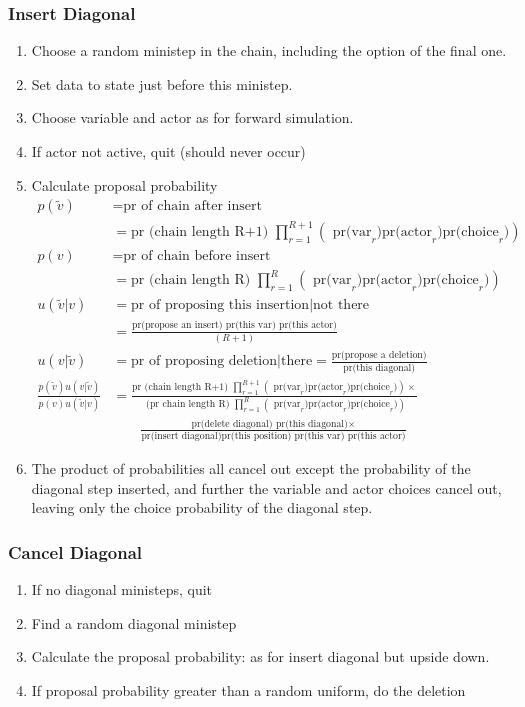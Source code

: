 \documentclass[12pt,a4paper]{article}
\renewcommand{\=}{\,=\,}
\newcommand{\+}{\,+\,}
\begin{document}
\subsubsection{Insert Diagonal}
\begin{enumerate}
\item Choose a random ministep in the chain, including the option of the final
  one.
\item Set data to state just before this ministep.
\item Choose variable and actor as for forward simulation.
\item If actor not active, quit (should never occur)
\item Calculate proposal probability
\begin{align*}
p(\tilde{v})&=\text{pr of chain after insert}\\
& = \text{pr (chain length R+1) }
 \prod_{r=1}^{R+1} \left( \text{ pr(var}_r )
\text{pr(actor}_r)\text{pr(choice}_r) \right)\\
p(v)&=\text{pr of chain before insert} \\
 & = \text{pr (chain length R) }
 \prod_{r=1}^{R} \left( \text{ pr(var}_r )
\text{pr(actor}_r)\text{pr(choice}_r) \right)\\
u(\tilde{v}|v) &= \text{pr of proposing this insertion} | \text{not
  there}\\
&=\frac{\text{pr(propose an insert) pr(this var) pr(this actor)}}{(R + 1)}\\
u(v|\tilde{v}) &= \text{pr of proposing deletion} | \text{there}=
\frac{\text{pr(propose a deletion)}}{\text{pr(this diagonal)}}\\
\frac{p(\tilde{v}) u(v|\tilde{v})}
 {p(v) u(\tilde{v}|v)}&=\frac{\text{pr (chain length R+1) }
 \prod_{r=1}^{R+1} \left( \text{ pr(var}_r )
\text{pr(actor}_r)\text{pr(choice}_r)\right) \times}{\text{ (pr chain length R) }
 \prod_{r=1}^{R} \left( \text{ pr(var}_r )
\text{pr(actor}_r)\text{pr(choice}_r) \right)}\\
&\qquad \frac{\text{pr(delete diagonal) pr(this diagonal)}
\times }
{\text{pr(insert diagonal)pr(this position) pr(this var) pr(this actor)} }
\end{align*}
\item The product of probabilities all cancel out except the probability of the
  diagonal step inserted, and further the variable and actor choices cancel out,
  leaving only the choice probability of the diagonal step.
\end{enumerate}
\subsubsection{Cancel Diagonal}
\begin{enumerate}
\item If no diagonal ministeps, quit
\item Find a random diagonal ministep
\item Calculate the proposal probability: as for insert diagonal but upside down.
\item If proposal probability greater than a random uniform, do the deletion
\end{enumerate}
\end{document}
